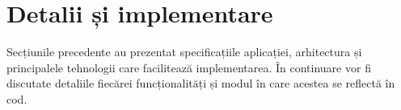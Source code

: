 \chapter{Detalii și implementare}\label{implementation}

Secțiunile precedente au prezentat specificațiile aplicației, arhitectura și principalele tehnologii care facilitează implementarea. În continuare vor fi discutate detaliile fiecărei funcționalități și modul în care acestea se reflectă în cod.






